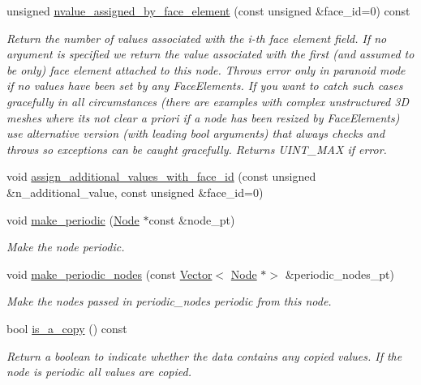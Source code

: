 \begin{DoxyCompactItemize}
unsigned \hyperlink{classoomph_1_1BoundaryNode_ac3a1c7120899518a10ae86bb8b1b6f17}{nvalue\+\_\+assigned\+\_\+by\+\_\+face\+\_\+element} (const unsigned \&face\+\_\+id=0) const
\begin{DoxyCompactList}\small\item\em Return the number of values associated with the i-\/th face element field. If no argument is specified we return the value associated with the first (and assumed to be only) face element attached to this node. Throws error only in paranoid mode if no values have been set by any Face\+Elements. If you want to catch such cases gracefully in all circumstances (there are examples with complex unstructured 3D meshes where it\textquotesingle{}s not clear a priori if a node has been resized by Face\+Elements) use alternative version (with leading bool arguments) that always checks and throws so exceptions can be caught gracefully. Returns U\+I\+N\+T\+\_\+\+M\+AX if error. \end{DoxyCompactList}\item 
void \hyperlink{classoomph_1_1BoundaryNode_a04ba9bf0b13ec5a8da2e2a27d41a1ef5}{assign\+\_\+additional\+\_\+values\+\_\+with\+\_\+face\+\_\+id} (const unsigned \&n\+\_\+additional\+\_\+value, const unsigned \&face\+\_\+id=0)
\item 
void \hyperlink{classoomph_1_1BoundaryNode_a96a34bd1911f8a125be570f361d3a211}{make\+\_\+periodic} (\hyperlink{classoomph_1_1Node}{Node} $\ast$const \&node\+\_\+pt)
\begin{DoxyCompactList}\small\item\em Make the node periodic. \end{DoxyCompactList}\item 
void \hyperlink{classoomph_1_1BoundaryNode_af41beccd082bdd4d2bd6205f374e47f5}{make\+\_\+periodic\+\_\+nodes} (const \hyperlink{classoomph_1_1Vector}{Vector}$<$ \hyperlink{classoomph_1_1Node}{Node} $\ast$$>$ \&periodic\+\_\+nodes\+\_\+pt)
\begin{DoxyCompactList}\small\item\em Make the nodes passed in periodic\+\_\+nodes periodic from this node. \end{DoxyCompactList}\item 
bool \hyperlink{classoomph_1_1BoundaryNode_a373e3a5c0f617eb91a54fa88c8e83c9e}{is\+\_\+a\+\_\+copy} () const
\begin{DoxyCompactList}\small\item\em Return a boolean to indicate whether the data contains any copied values. If the node is periodic all values are copied. \end{DoxyCompactList}\item 
$$
\end{DoxyCompactItemize}
